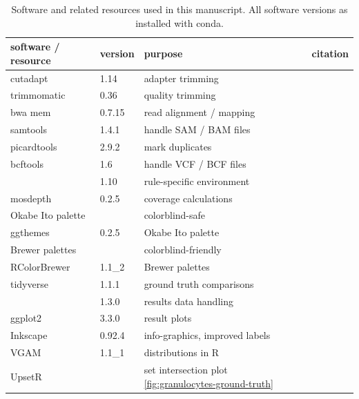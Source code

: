\documentclass[authoryear,preprint,11pt]{scrartcl}
\begin{document}
\begin{center}
 \begin{table}[tbp]
  \caption{Software and related resources used in this manuscript. All software versions as installed with conda.}
  \label{tab:software-overview}
  \begin{tabular}{llll}
    \toprule
    software / resource & version   & purpose                       & citation \\
    \toprule
    cutadapt            & 1.14      & adapter trimming              & \citep{martin_cutadapt_2011} \\
    \midrule
    trimmomatic         & 0.36      & quality trimming              & \citep{bolger_trimmomatic_2014} \\
    \midrule
    bwa mem             & 0.7.15    & read alignment / mapping      & \citep{li_aligning_2013} \\
    \midrule
    samtools            & 1.4.1     & handle SAM / BAM files        & \citep{li_sequence_2009} \\
    \midrule
    picardtools         & 2.9.2     & mark duplicates               &  \\
    \midrule
    bcftools            & 1.6       & handle VCF / BCF files        & \citep{danecek_variant_2011} \\
                        & 1.10      & rule-specific environment     &  \\
    \midrule
    mosdepth            & 0.2.5     & coverage calculations         & \citep{pedersen_mosdepth_2018} \\
    \midrule
    Okabe Ito palette   &           & colorblind-safe               & \citep{okabe_color_2008} \\
    \midrule
    ggthemes            & 0.2.5     & Okabe Ito palette             & \citep{arnold_ggthemes_2019} \\
    \midrule
    Brewer palettes     &           & colorblind-friendly           & \citep{brewer_colorbrewer_2006} \\
    \midrule
    RColorBrewer        & 1.1\_2     & Brewer palettes              & \citep{neuwirth_rcolorbrewer_2014} \\
    \midrule
    tidyverse           & 1.1.1     & ground truth comparisons      & \citep{wickham_welcome_2019} \\
                        & 1.3.0     & results data handling         &  \\
    \midrule
    ggplot2             & 3.3.0     & result plots                  & \citep{wickham_ggplot2_2016} \\
    \midrule
    Inkscape            & 0.92.4    & info-graphics, improved labels & \\
    \midrule
    VGAM                & 1.1\_1     & distributions in R            & \citep{yee_vgam_2008,yee_vector_2015} \\
    \midrule
    UpsetR              &           & set intersection plot \ref{fig:granulocytes-ground-truth} & \citep{conway_upsetr_2017} \\
    \bottomrule
  \end{tabular}
 \end{table}
\end{center}




\end{document}
